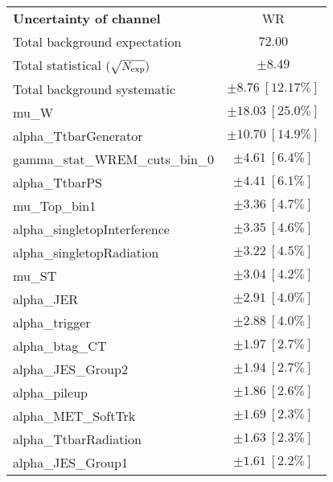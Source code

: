 
\begin{table}
\begin{center}
\setlength{\tabcolsep}{0.0pc}
\begin{tabular*}{\textwidth}{@{\extracolsep{\fill}}lc}
\noalign{\smallskip}\hline\noalign{\smallskip}
{\bf Uncertainty of channel}                                    & WR           \\
\noalign{\smallskip}\hline\noalign{\smallskip}
Total background expectation             &  $72.00$       \\
\noalign{\smallskip}\hline\noalign{\smallskip}
Total statistical $(\sqrt{N_{\rm exp}})$              & $\pm 8.49$       \\
Total background systematic               & $\pm 8.76\ [12.17\%] $             \\
\noalign{\smallskip}\hline\noalign{\smallskip}
\noalign{\smallskip}\hline\noalign{\smallskip}
mu\_W         & $\pm 18.03\ [25.0\%] $       \\
alpha\_TtbarGenerator         & $\pm 10.70\ [14.9\%] $       \\
gamma\_stat\_WREM\_cuts\_bin\_0         & $\pm 4.61\ [6.4\%] $       \\
alpha\_TtbarPS         & $\pm 4.41\ [6.1\%] $       \\
mu\_Top\_bin1         & $\pm 3.36\ [4.7\%] $       \\
alpha\_singletopInterference         & $\pm 3.35\ [4.6\%] $       \\
alpha\_singletopRadiation         & $\pm 3.22\ [4.5\%] $       \\
mu\_ST         & $\pm 3.04\ [4.2\%] $       \\
alpha\_JER         & $\pm 2.91\ [4.0\%] $       \\
alpha\_trigger         & $\pm 2.88\ [4.0\%] $       \\
alpha\_btag\_CT         & $\pm 1.97\ [2.7\%] $       \\
alpha\_JES\_Group2         & $\pm 1.94\ [2.7\%] $       \\
alpha\_pileup         & $\pm 1.86\ [2.6\%] $       \\
alpha\_MET\_SoftTrk         & $\pm 1.69\ [2.3\%] $       \\
alpha\_TtbarRadiation         & $\pm 1.63\ [2.3\%] $       \\
alpha\_JES\_Group1         & $\pm 1.61\ [2.2\%] $       \\

\end{tabular*}
\end{center}
\end{table}
